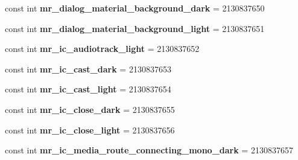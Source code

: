 \begin{DoxyCompactItemize}
const int {\bfseries mr\+\_\+dialog\+\_\+material\+\_\+background\+\_\+dark} = 2130837650
\item 
\mbox{\label{class_pinned_app_1_1_droid_1_1_resource_1_1_drawable_ad168c4b3f35cf75ec483a967345dd023}} 
const int {\bfseries mr\+\_\+dialog\+\_\+material\+\_\+background\+\_\+light} = 2130837651
\item 
\mbox{\label{class_pinned_app_1_1_droid_1_1_resource_1_1_drawable_a32e5b546857b9c2c4b393821b5ed61a5}} 
const int {\bfseries mr\+\_\+ic\+\_\+audiotrack\+\_\+light} = 2130837652
\item 
\mbox{\label{class_pinned_app_1_1_droid_1_1_resource_1_1_drawable_a29681e3317d37f309c0580ef666e162c}} 
const int {\bfseries mr\+\_\+ic\+\_\+cast\+\_\+dark} = 2130837653
\item 
\mbox{\label{class_pinned_app_1_1_droid_1_1_resource_1_1_drawable_a6260ba53614d013aed0ff9e34f874603}} 
const int {\bfseries mr\+\_\+ic\+\_\+cast\+\_\+light} = 2130837654
\item 
\mbox{\label{class_pinned_app_1_1_droid_1_1_resource_1_1_drawable_a967f04bc079b5d848ad639c4439369d2}} 
const int {\bfseries mr\+\_\+ic\+\_\+close\+\_\+dark} = 2130837655
\item 
\mbox{\label{class_pinned_app_1_1_droid_1_1_resource_1_1_drawable_a32c06e84f71161e03ef13c9fd53d71b6}} 
const int {\bfseries mr\+\_\+ic\+\_\+close\+\_\+light} = 2130837656
\item 
\mbox{\label{class_pinned_app_1_1_droid_1_1_resource_1_1_drawable_a20c3e4ffd8a6e2e611dca70b1551b554}} 
const int {\bfseries mr\+\_\+ic\+\_\+media\+\_\+route\+\_\+connecting\+\_\+mono\+\_\+dark} = 2130837657
\item 
\mbox{\label{class_pinned_app_1_1_droid_1_1_resource_1_1_drawable_a9172db25448c8408f7f60c4442bc056c}} 

\end{DoxyCompactItemize}
